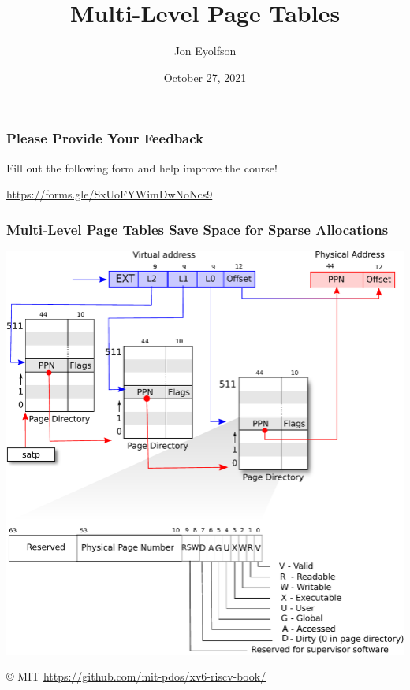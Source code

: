 

\title{Multi-Level Page Tables}
\author{Jon Eyolfson}
\date{October 27, 2021}


  \begin{frame}
    \titlepage
  \end{frame}

  \begin{frame}
    \frametitle{Please Provide Your Feedback}

    Fill out the following form and help improve the course!

    \vspace{2em}

    \url{https://forms.gle/SxUoFYWimDwNoNcs9}
  \end{frame}

  \begin{frame}
    \frametitle{Multi-Level Page Tables Save Space for Sparse Allocations}

    \begin{center}
      \includegraphics[scale=0.5, clip, trim=0cm 8cm 0cm 0cm]{../lecture-19/riscv_pagetable.pdf}
    \end{center}

    © MIT \url{https://github.com/mit-pdos/xv6-riscv-book/}
  \end{frame}

